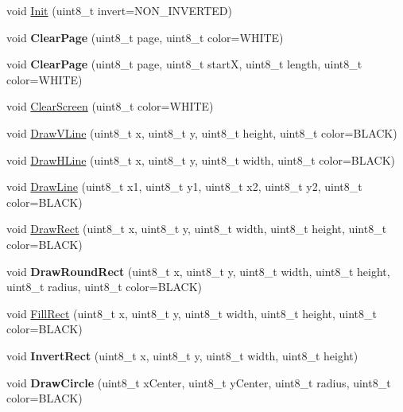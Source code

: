 \begin{DoxyCompactItemize}
\item 
void \hyperlink{classglcd_aba75fe511781243aeb06df806bb4782a}{Init} (uint8\_\-t invert=NON\_\-INVERTED)
\item 
\hypertarget{classglcd_aee55835080cf4b713f98dbfc5b98af16}{
void {\bfseries ClearPage} (uint8\_\-t page, uint8\_\-t color=WHITE)}
\label{classglcd_aee55835080cf4b713f98dbfc5b98af16}

\item 
\hypertarget{classglcd_a1f3d55d537a3aa0932a9c0c2e08dab32}{
void {\bfseries ClearPage} (uint8\_\-t page, uint8\_\-t startX, uint8\_\-t length, uint8\_\-t color=WHITE)}
\label{classglcd_a1f3d55d537a3aa0932a9c0c2e08dab32}

\item 
void \hyperlink{classglcd_a0bfcbfcca05643356eefbc0f94a62ea6}{ClearScreen} (uint8\_\-t color=WHITE)
\item 
void \hyperlink{classglcd_a93adb4256767b495b15fb326d6d2c01a}{DrawVLine} (uint8\_\-t x, uint8\_\-t y, uint8\_\-t height, uint8\_\-t color=BLACK)
\item 
void \hyperlink{classglcd_ad44a983103e20535558b69ba15504493}{DrawHLine} (uint8\_\-t x, uint8\_\-t y, uint8\_\-t width, uint8\_\-t color=BLACK)
\item 
void \hyperlink{classglcd_a2995efe72f737e151794898d0f3f784f}{DrawLine} (uint8\_\-t x1, uint8\_\-t y1, uint8\_\-t x2, uint8\_\-t y2, uint8\_\-t color=BLACK)
\item 
void \hyperlink{classglcd_adbbbba35a6019a7b050e6234619446c0}{DrawRect} (uint8\_\-t x, uint8\_\-t y, uint8\_\-t width, uint8\_\-t height, uint8\_\-t color=BLACK)
\item 
\hypertarget{classglcd_a68b290c71c58892ac7092b72325db754}{
void {\bfseries DrawRoundRect} (uint8\_\-t x, uint8\_\-t y, uint8\_\-t width, uint8\_\-t height, uint8\_\-t radius, uint8\_\-t color=BLACK)}
\label{classglcd_a68b290c71c58892ac7092b72325db754}

\item 
void \hyperlink{classglcd_ac3ee3809429b633e17734b0b8ca7d010}{FillRect} (uint8\_\-t x, uint8\_\-t y, uint8\_\-t width, uint8\_\-t height, uint8\_\-t color=BLACK)
\item 
\hypertarget{classglcd_a09d544feba1fbe36b98b18cc3fa0c129}{
void {\bfseries InvertRect} (uint8\_\-t x, uint8\_\-t y, uint8\_\-t width, uint8\_\-t height)}
\label{classglcd_a09d544feba1fbe36b98b18cc3fa0c129}

\item 
\hypertarget{classglcd_a91c42301a5a8e808b59cbd6645500aed}{
void {\bfseries DrawCircle} (uint8\_\-t xCenter, uint8\_\-t yCenter, uint8\_\-t radius, uint8\_\-t color=BLACK)}
\label{classglcd_a91c42301a5a8e808b59cbd6645500aed}


\end{DoxyCompactItemize}
